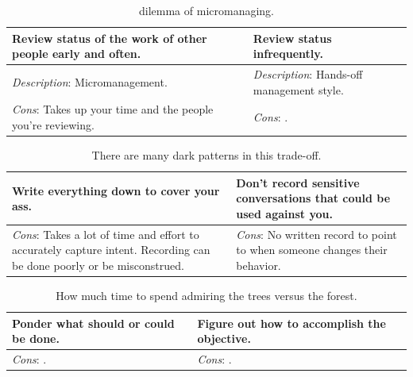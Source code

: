 \begin{center}
\begin{table}[ht]
\begin{tabular}{ | m{\dilemmatablewidth}| m{\dilemmatablewidth} | } 
  \hline
  \textbf{Review status of the work of other people early and often.} &
  \textbf{Review status infrequently.} \\
  \hline
  \textit{Description}: Micromanagement. & 
  \textit{Description}: Hands-off management style. \\
  \hline
  \textit{Cons}: Takes up your time and the people you're reviewing. & 
  \textit{Cons}: . \\
  \hline
\end{tabular}
\caption{dilemma of micromanaging.}
\label{table:micromanaging}
\end{table}
\end{center}

\begin{center}
\begin{table}[ht]
\begin{tabular}{ | m{\dilemmatablewidth}| m{\dilemmatablewidth} | } 
  \hline
  \textbf{Write everything down to cover your ass.} &
  \textbf{Don't record sensitive conversations that could be used against you.} \\
  \hline
  \textit{Cons}: Takes a lot of time and effort to accurately capture intent. Recording can be done poorly or be misconstrued.  & 
  \textit{Cons}: No written record to point to when someone changes their behavior. \\
  \hline
\end{tabular}
\caption{There are many dark patterns in this trade-off.}
\label{table:notes_or_no_notes}
\end{table}
\end{center}


\begin{center}
\begin{table}[ht]
\begin{tabular}{ | m{\dilemmatablewidth}| m{\dilemmatablewidth} | } 
  \hline
  \textbf{Ponder what should or could be done.} &
  \textbf{Figure out how to accomplish the objective.}\\
  \hline
  \textit{Cons}: . & 
  \textit{Cons}: . \\
  \hline
\end{tabular}
\caption{How much time to spend admiring the trees versus the forest. 
}
\label{table:forest-vs-trees}
\end{table}
\end{center}




